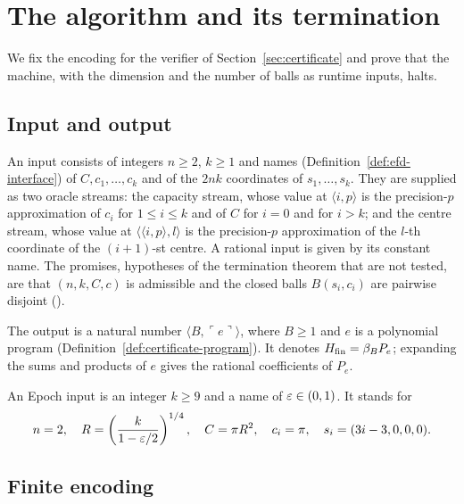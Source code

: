 \section{The algorithm and its termination}\label{sec:alg}

We fix the encoding for the verifier of Section~\ref{sec:certificate} and prove that the machine, with the dimension and the number of balls as runtime inputs, halts.

\subsection{Input and output}\label{sec:alg-input}

\begin{definition}[Input]\label{def:alg-input}
An input consists of integers $n\ge2$, $k\ge1$ and names (Definition~\ref{def:efd-interface}) of $C,c_1,\ldots,c_k$
and of the $2nk$ coordinates of $s_1,\ldots,s_k$. They are supplied as two oracle streams: the capacity stream,
whose value at $\langle i,p\rangle$ is the precision-$p$ approximation of $c_i$ for $1\le i\le k$ and of $C$ for $i=0$ and for $i>k$;
and the centre stream, whose value at $\langle\langle i,p\rangle,l\rangle$ is the precision-$p$ approximation of the
$l$-th coordinate of the $(i+1)$-st centre. A rational input is given by its constant name. The promises, hypotheses of the termination theorem that are not tested, are that
$(n,k,C,c)$ is admissible and the closed balls $B(s_i,c_i)$ are pairwise disjoint ().

The output is a natural number $\langle B,\ulcorner e\urcorner\rangle$, where $B\ge1$ and $e$ is a polynomial program
(Definition~\ref{def:certificate-program}). It denotes $H_{\mathrm{fin}}=\beta_BP_e$; expanding the sums and products of $e$
gives the rational coefficients of $P_e$.

An Epoch input is an integer $k\ge9$ and a name of $\varepsilon\in(0,1)$. It stands for
\begin{equation}\label{eq:alg-epoch-data}
 n=2,\quad R=\left(\frac{k}{1-\varepsilon/2}\right)^{1/4},\quad
 C=\pi R^2,\quad c_i=\pi,\quad s_i=(3i-3,0,0,0).
\end{equation}
\end{definition}

\subsection{Finite encoding}\label{sec:alg-searches}

